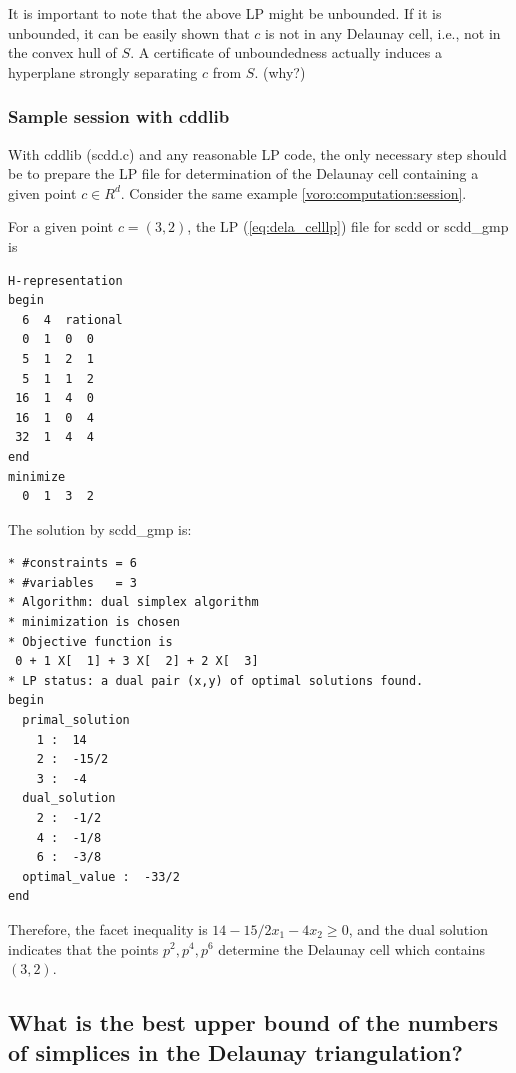 \documentclass[a4paper,12pt]{article}
\newcommand{\HBrule}{\noindent \hrulefill \medskip}
\newcommand{\HTrule}{\medskip \noindent \hrulefill}
\begin{document}
It is important to note that the above LP might be unbounded.  If it
is unbounded, it can be easily shown that $c$ is not in
any Delaunay cell, i.e., not in the convex hull of $S$.  A certificate
of unboundedness actually induces a hyperplane strongly separating
$c$ from $S$. (why?)

\subsubsection{Sample session with cddlib} 
\label{dela:computation:session}

\begin{small}

With cddlib (scdd.c) and any reasonable LP code, the only necessary step should be
to prepare the LP file for determination
of the Delaunay cell containing a given point $c\in R^d$.  
Consider the same example \ref{voro:computation:session}.  

For a given point $c = (3, 2)$, 
the LP (\ref{eq:dela_celllp}) file for scdd or scdd\_gmp is

\HTrule
\begin{verbatim}
H-representation
begin
  6  4  rational
  0  1  0  0
  5  1  2  1
  5  1  1  2
 16  1  4  0
 16  1  0  4
 32  1  4  4
end
minimize
  0  1  3  2
\end{verbatim}
\HBrule

\noindent
The solution by scdd\_gmp is:

\HTrule
\begin{verbatim}
* #constraints = 6
* #variables   = 3
* Algorithm: dual simplex algorithm
* minimization is chosen
* Objective function is
 0 + 1 X[  1] + 3 X[  2] + 2 X[  3]
* LP status: a dual pair (x,y) of optimal solutions found.
begin
  primal_solution
    1 :  14
    2 :  -15/2
    3 :  -4
  dual_solution
    2 :  -1/2
    4 :  -1/8
    6 :  -3/8
  optimal_value :  -33/2
end
\end{verbatim}
\HBrule

Therefore, the facet inequality is $ 14 - 15/2 x_1 - 4 x_2 \ge 0$, and
the dual solution indicates that the points $p^2, p^4, p^6$ determine
the Delaunay cell which contains $(3, 2)$.


\end{small}



\subsection{What is the best upper bound of the numbers of 
simplices in the Delaunay triangulation?} \label{voro:upperbound}
\end{document}
